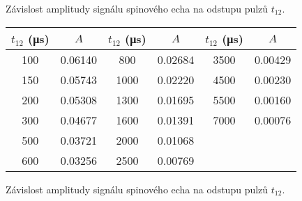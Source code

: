 \begin{graph}[htbp] 
\centering

\caption{Závislost amplitudy signálu spinového echa na odstupu pulzů $t_{12}$.}
\label{g:t2}
\end{graph}

\begin{tabulka}[htbp]
\centering
\begin{tabular}{cc|cc|cc}
$t_{12}$ (\si{\us}) & $A$ & $t_{12}$ (\si{\us}) & $A$ & $t_{12}$ (\si{\us}) & $A$ \\\hline
100 & \num{0.06140}  & 800  & \num{0.02684}  & 3500 & \num{0.00429}\\
150 & \num{0.05743}  & 1000 & \num{0.02220}  & 4500 & \num{0.00230}\\
200 & \num{0.05308}  & 1300 & \num{0.01695}  & 5500 & \num{0.00160}\\
300 & \num{0.04677}  & 1600 & \num{0.01391}  & 7000 & \num{0.00076}\\
500 & \num{0.03721}  & 2000 & \num{0.01068}  &  & \\
600 & \num{0.03256}  & 2500 & \num{0.00769}  &  & \\
\end{tabular}
\caption{Závislost amplitudy signálu spinového echa na odstupu pulzů $t_{12}$.}
\label{t:t2}
\end{tabulka}




